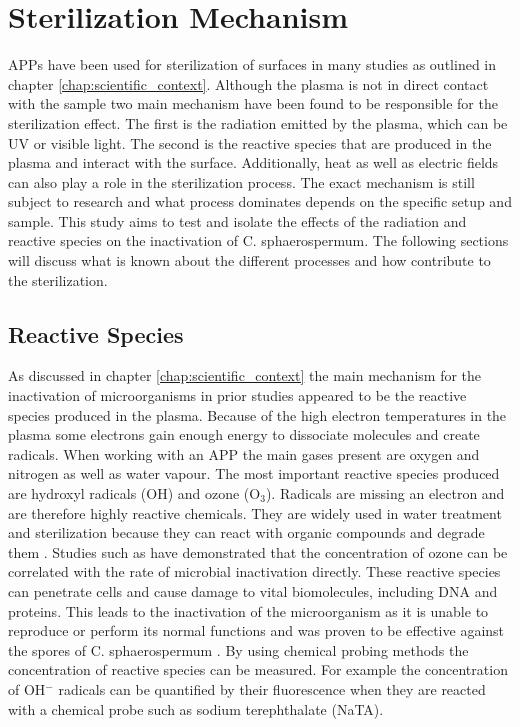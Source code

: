 \section{Sterilization Mechanism}
APPs have been used for sterilization of surfaces in many studies as outlined in chapter \ref{chap:scientific_context}. Although the plasma is not in direct contact with the sample two main mechanism have been found to be responsible for the sterilization effect. The first is the radiation emitted by the plasma, which can be UV or visible light. The second is the reactive species that are produced in the plasma and interact with the surface. Additionally, heat as well as electric fields can also play a role in the sterilization process. The exact mechanism is still subject to research and what process dominates depends on the specific setup and sample. This study aims to test and isolate the effects of the radiation and reactive species on the inactivation of C. sphaerospermum. The following sections will discuss what is known about the different processes and how contribute to the sterilization.

\subsection{Reactive Species}
As discussed in chapter \ref{chap:scientific_context} the main mechanism for the inactivation of microorganisms in prior studies appeared to be the reactive species produced in the plasma. Because of the high electron temperatures in the plasma some electrons gain enough energy to dissociate molecules and create radicals. When working with an APP the main gases present are oxygen and nitrogen as well as water vapour. The most important reactive species produced are hydroxyl radicals (OH) and ozone (O$_3$). Radicals are missing an electron and are therefore highly reactive chemicals. They are widely used in water treatment and sterilization because they can react with organic compounds and degrade them \cite{water}. Studies such as \cite{ozone} have demonstrated that the concentration of ozone can be correlated with the rate of microbial inactivation directly. These reactive species can penetrate cells and cause damage to vital biomolecules, including DNA and proteins.
This leads to the inactivation of the microorganism as it is unable to reproduce or perform its normal functions and was proven to be effective against the spores of C. sphaerospermum \cite{kit}. By using chemical probing methods the concentration of reactive species can be measured. For example the concentration of OH$^-$ radicals can be quantified by their fluorescence when they are reacted with a chemical probe such as sodium terephthalate (NaTA). 

